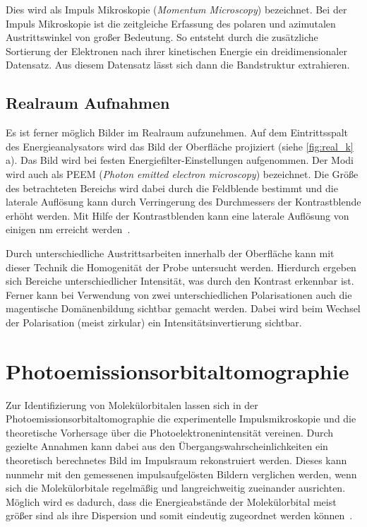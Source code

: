             Dies wird als Impuls Mikroskopie (\textit{Momentum Microscopy}) bezeichnet.
            Bei der Impuls Mikroskopie ist die zeitgleiche Erfassung des polaren und azimutalen Austrittswinkel von großer Bedeutung. 
            So entsteht durch die zusätzliche Sortierung der Elektronen nach ihrer kinetischen Energie ein dreidimensionaler Datensatz.
            Aus diesem Datensatz lässt sich dann die Bandstruktur extrahieren.

        \subsection{Realraum Aufnahmen}
            Es ist ferner möglich Bilder im Realraum aufzunehmen.
            Auf dem Eintrittsspalt des Energieanalysators wird das Bild der Oberfläche projiziert (siehe \autoref{fig:real_k}\,a).
            Das Bild wird bei festen Energiefilter-Einstellungen aufgenommen.
            Der Modi wird auch als PEEM (\textit{Photon emitted electron microscopy}) bezeichnet.
            Die Größe des betrachteten Bereichs wird dabei durch die Feldblende bestimmt und die laterale Auflösung kann durch Verringerung des Durchmessers der Kontrastblende erhöht werden.
            Mit Hilfe der Kontrastblenden kann eine laterale Auflösung von einigen \si{\nano\meter} erreicht werden~\cite{locatelli_chemical_2015}. 

            Durch unterschiedliche Austrittsarbeiten innerhalb der Oberfläche kann mit dieser Technik die Homogenität der Probe untersucht werden.
            Hierdurch ergeben sich Bereiche unterschiedlicher Intensität, was durch den Kontrast erkennbar ist.
            Ferner kann bei Verwendung von zwei unterschiedlichen Polarisationen auch die magentische Domänenbildung sichtbar gemacht werden.
            Dabei wird beim Wechsel der Polarisation (meist zirkular) ein Intensitätsinvertierung sichtbar.
        
    \section{Photoemissionsorbitaltomographie} \label{sec:MOT}
        Zur Identifizierung von Molekülorbitalen lassen sich in der Photoemissionsorbitaltomographie die experimentelle Impulsmikroskopie und die theoretische Vorhersage über die Photoelektronenintensität vereinen.
        Durch gezielte Annahmen kann dabei aus den Übergangswahrscheinlichkeiten ein theoretisch berechnetes Bild im Impulsraum rekonstruiert werden.
        Dieses kann nunmehr mit den gemessenen impulsaufgelösten Bildern verglichen werden, wenn sich die Molekülorbitale regelmäßig und langreichweitig zueinander ausrichten.
        Möglich wird es dadurch, dass die Energieabstände der Molekülorbital meist größer sind als ihre Dispersion und somit eindeutig zugeordnet werden können~\cite{puschnig_reconstruction_2009}.

